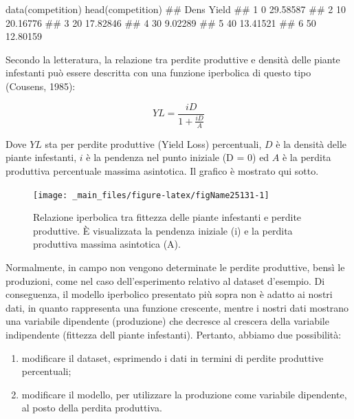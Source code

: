 \documentclass[a4paper,12pt,oneside]{book}
\providecommand{\tightlist}{%
  \setlength{\itemsep}{0pt}\setlength{\parskip}{0pt}}
\newenvironment{Shaded}{\begin{snugshade}}{\end{snugshade}}
\newcommand{\DocumentationTok}[1]{#1}
\newcommand{\FunctionTok}[1]{#1}
\newcommand{\NormalTok}[1]{#1}
\begin{document}
\begin{Shaded}
\begin{Highlighting}[]
\FunctionTok{data}\NormalTok{(competition)}
\FunctionTok{head}\NormalTok{(competition)}
\DocumentationTok{\#\#   Dens    Yield}
\DocumentationTok{\#\# 1    0 29.58587}
\DocumentationTok{\#\# 2   10 20.16776}
\DocumentationTok{\#\# 3   20 17.82846}
\DocumentationTok{\#\# 4   30  9.02289}
\DocumentationTok{\#\# 5   40 13.41521}
\DocumentationTok{\#\# 6   50 12.80159}
\end{Highlighting}
\end{Shaded}

Secondo la letteratura, la relazione tra perdite produttive e densità delle piante infestanti può essere descritta con una funzione iperbolica di questo tipo (Cousens, 1985):

\[YL = \frac{iD}{1 + \frac{iD}{A}}\]

Dove \(YL\) sta per perdite produttive (Yield Loss) percentuali, \(D\) è la densità delle piante infestanti, \(i\) è la pendenza nel punto iniziale (D = 0) ed \(A\) è la perdita produttiva percentuale massima asintotica. Il grafico è mostrato qui sotto.

\begin{figure}

{\centering \texttt{[image: \_main\_files/figure-latex/figName25131-1]} 

}

\caption{Relazione iperbolica tra fittezza delle piante infestanti e perdite produttive. È  visualizzata la pendenza iniziale (i) e la perdita produttiva massima asintotica (A).}\label{fig:figName25131}
\end{figure}

Normalmente, in campo non vengono determinate le perdite produttive, bensì le produzioni, come nel caso dell'esperimento relativo al dataset d'esempio. Di conseguenza, il modello iperbolico presentato più sopra non è adatto ai nostri dati, in quanto rappresenta una funzione crescente, mentre i nostri dati mostrano una variabile dipendente (produzione) che decresce al crescera della variabile indipendente (fittezza dell piante infestanti). Pertanto, abbiamo due possibilità:

\begin{enumerate}
\def\labelenumi{\arabic{enumi}.}
\tightlist
\item
  modificare il dataset, esprimendo i dati in termini di perdite produttive percentuali;
\item
  modificare il modello, per utilizzare la produzione come variabile dipendente, al posto della perdita produttiva.
\end{enumerate}
\end{document}
